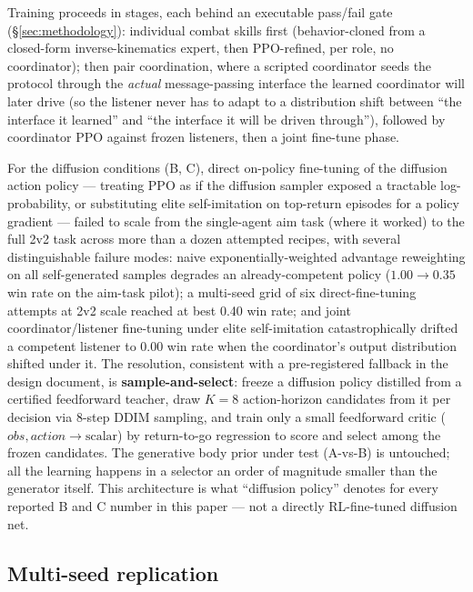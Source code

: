\documentclass[11pt]{article}
\begin{document}
Training proceeds in stages, each behind an executable pass/fail gate
(\S\ref{sec:methodology}): individual combat skills first
(behavior-cloned from a closed-form inverse-kinematics expert, then
PPO-refined, per role, no coordinator); then pair coordination, where a
scripted coordinator seeds the protocol through the \emph{actual}
message-passing interface the learned coordinator will later drive (so
the listener never has to adapt to a distribution shift between ``the
interface it learned'' and ``the interface it will be driven
through''), followed by coordinator PPO against frozen listeners, then
a joint fine-tune phase.

For the diffusion conditions (B, C), direct on-policy fine-tuning of the
diffusion action policy --- treating PPO as if the diffusion sampler
exposed a tractable log-probability, or substituting elite
self-imitation on top-return episodes for a policy gradient --- failed
to scale from the single-agent aim task (where it worked) to the full
2v2 task across more than a dozen attempted recipes, with several
distinguishable failure modes: naive exponentially-weighted advantage
reweighting on all self-generated samples degrades an already-competent
policy ($1.00 \rightarrow 0.35$ win rate on the aim-task pilot); a
multi-seed grid of six direct-fine-tuning attempts at 2v2 scale reached
at best 0.40 win rate; and joint coordinator/listener fine-tuning under
elite self-imitation catastrophically drifted a competent listener to
0.00 win rate when the coordinator's output distribution shifted under
it. The resolution, consistent with a pre-registered fallback in the
design document, is \textbf{sample-and-select}: freeze a diffusion
policy distilled from a certified feedforward teacher, draw $K=8$
action-horizon candidates from it per decision via 8-step DDIM
sampling, and train only a small feedforward critic
($\mathit{obs}, \mathit{action} \rightarrow \mathrm{scalar}$) by
return-to-go regression to score and select among the frozen
candidates. The generative body prior under test (A-vs-B) is untouched;
all the learning happens in a selector an order of magnitude smaller
than the generator itself. This architecture is what ``diffusion
policy'' denotes for every reported B and C number in this paper ---
not a directly RL-fine-tuned diffusion net.

\subsection{Multi-seed replication}
\label{sec:multiseed}
\end{document}
